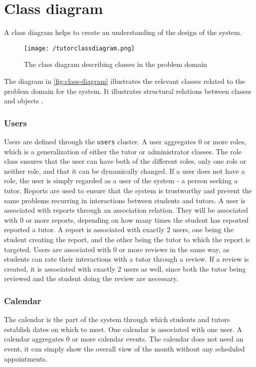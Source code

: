 \section{Class diagram}
A class diagram helps to create an understanding of the design of the system.
\begin{figure}[]
    \texttt{[image: /tutorclassdiagram.png]}
     \caption{The class diagram describing classes in the problem domain}
     \label{fig:class-diagram}
 \end{figure}
The diagram in \autoref{fig:class-diagram} illustrates the relevant classes related to the problem domain for the system.
It illustrates structural relations between classes and objects \cite{OOAD}.

\subsubsection{Users}
Users are defined through the \texttt{users} cluster.
A user aggregates 0 or more roles, which is a generalization of either the tutor or administrator classes.
The role class ensures that the user can have both of the different roles, only one role or neither role, and that it can be dynamically changed.
If a user does not have a role, the user is simply regarded as a user of the system - a person seeking a tutor.
Reports are used to ensure that the system is trustworthy and prevent the same problems recurring in interactions between students and tutors.
A user is associated with reports through an association relation.
They will be associated with 0 or more reports, depending on how many times the student has reported reported a tutor.
A report is associated with exactly 2 users, one being the student creating the report, and the other being the tutor to which the report is targeted.
Users are associated with 0 or more reviews in the same way, as students can rate their interactions with a tutor through a review.
If a review is created, it is associated with exactly 2 users as well, since both the tutor being reviewed and the student doing the review are necessary.

\subsubsection{Calendar}
The calendar is the part of the system through which students and tutors establish dates on which to meet.
One calendar is associated with one user.
A calendar aggregates 0 or more calendar events.
The calendar does not need an event, it can simply show the overall view of the month without any scheduled appointments.

